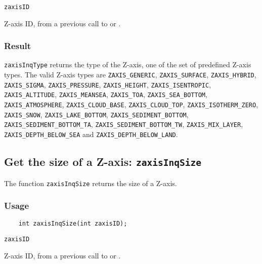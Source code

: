 \hspace*{4mm}\begin{minipage}[]{15cm}
\begin{deflist}{\tt zaxisID\ }
\item[{\tt zaxisID}]
Z-axis ID, from a previous call to {} or {}.

\end{deflist}
\end{minipage}

\subsubsection*{Result}

{\tt zaxisInqType} returns the type of the Z-axis,
one of the set of predefined {\CDI} Z-axis types.
The valid {\CDI} Z-axis types are {\tt ZAXIS\_GENERIC}, {\tt ZAXIS\_SURFACE},
{\tt ZAXIS\_HYBRID}, {\tt ZAXIS\_SIGMA}, {\tt ZAXIS\_PRESSURE}, {\tt ZAXIS\_HEIGHT},
{\tt ZAXIS\_ISENTROPIC}, {\tt ZAXIS\_ALTITUDE}, {\tt ZAXIS\_MEANSEA}, {\tt ZAXIS\_TOA},
{\tt ZAXIS\_SEA\_BOTTOM}, {\tt ZAXIS\_ATMOSPHERE}, {\tt ZAXIS\_CLOUD\_BASE},
{\tt ZAXIS\_CLOUD\_TOP}, {\tt ZAXIS\_ISOTHERM\_ZERO}, {\tt ZAXIS\_SNOW},
{\tt ZAXIS\_LAKE\_BOTTOM}, {\tt ZAXIS\_SEDIMENT\_BOTTOM}, {\tt ZAXIS\_SEDIMENT\_BOTTOM\_TA},
{\tt ZAXIS\_SEDIMENT\_BOTTOM\_TW}, {\tt ZAXIS\_MIX\_LAYER},
{\tt ZAXIS\_DEPTH\_BELOW\_SEA} and {\tt ZAXIS\_DEPTH\_BELOW\_LAND}.



\subsection{Get the size of a Z-axis: {\tt zaxisInqSize}}
\label{zaxisInqSize}

The function {\tt zaxisInqSize} returns the size of a Z-axis.

\subsubsection*{Usage}

\begin{verbatim}
    int zaxisInqSize(int zaxisID);
\end{verbatim}

\hspace*{4mm}\begin{minipage}[]{15cm}
\begin{deflist}{\tt zaxisID\ }
\item[{\tt zaxisID}]
Z-axis ID, from a previous call to {} or {}.

\end{deflist}
\end{minipage}

